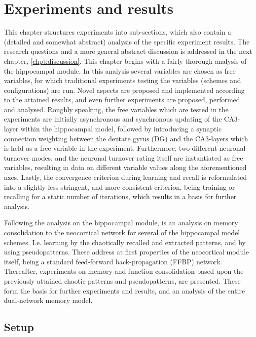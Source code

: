 
\chapter{Experiments and results}\label{chpt:experiments}

This chapter structures experiments into sub-sections, which also contain a (detailed and somewhat abstract) analysis of the specific experiment results. The research questions and a more general abstract discussion is addressed in the next chapter, \ref{chpt:discussion}.
This chapter begins with a fairly thorough analysis of the hippocampal module. In this analysis several variables are chosen as free variables, for which traditional experiments testing the variables (schemes and configurations) are run. Novel aspects are proposed and implemented according to the attained results, and even further experiments are proposed, performed and analysed.
Roughly speaking, the free variables which are tested in the experiments are initially asynchronous and synchronous updating of the CA3-layer within the hippocampal model, followed by introducing a synaptic connection weighting between the dentate gyrus (DG) and the CA3-layers which is held as a free variable in the experiment. Furthermore, two different neuronal turnover modes, and the neuronal turnover rating itself are instantiated as free variables, resulting in data on different variable values along the aforementioned axes. Lastly, the convergence criterion during learning and recall is reformulated into a slightly less stringent, and more consistent criterion, being training or recalling for a static number of iterations, which results in a basis for further analysis.

Following the analysis on the hippocampal module, is an analysis on memory consolidation to the neocortical network for several of the hippocampal model schemes. I.e. learning by the chaotically recalled and extracted patterns, and by using pseudopatterns.
These address at first properties of the neocortical module itself, being a standard feed-forward back-propagation (FFBP) network. Thereafter, experiments on memory and function consolidation based upon the previously attained chaotic patterns and pseudopatterns, are presented. These form the basis for further experiments and results, and an analysis of the entire dual-network memory model.


\section{Setup}

